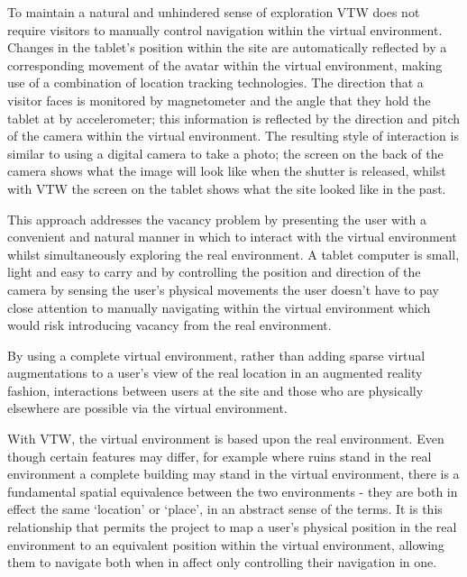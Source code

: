 To maintain a natural and unhindered sense of exploration VTW does not require visitors to manually control navigation within the virtual environment. Changes in the tablet's position within the site are automatically reflected by a corresponding movement of the avatar within the virtual environment, making use of a combination of location tracking technologies. The direction that a visitor faces is monitored by magnetometer and the angle that they hold the tablet at by accelerometer; this information is reflected by the direction and pitch of the camera within the virtual environment. The resulting style of interaction is similar to using a digital camera to take a photo; the screen on the back of the camera shows what the image will look like when the shutter is released, whilst with VTW the screen on the tablet shows what the site looked like in the past.

This approach addresses the vacancy problem by presenting the user with a convenient and natural manner in which to interact with the virtual environment whilst simultaneously exploring the real environment. A tablet computer is small, light and easy to carry and by controlling the position and direction of the camera by sensing the user's physical movements the user doesn't have to pay close attention to manually navigating within the virtual environment which would risk introducing vacancy from the real environment.

By using a complete virtual environment, rather than adding sparse virtual augmentations to a user's view of the real location in an augmented reality fashion, interactions between users at the site and those who are physically elsewhere are possible via the virtual environment.

With VTW, the virtual environment is based upon the real environment. Even though certain features may differ, for example where ruins stand in the real environment a complete building may stand in the virtual environment, there is a fundamental spatial equivalence between the two environments - they are both in effect the same `location' or `place', in an abstract sense of the terms. It is this relationship that permits the project to map a user's physical position in the real environment to an equivalent position within the virtual environment, allowing them to navigate both when in affect only controlling their navigation in one.

